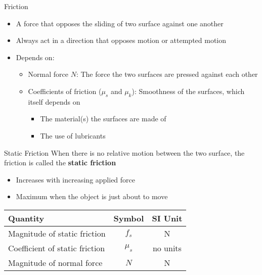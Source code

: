 \documentclass[12pt,compress,aspectratio=169]{beamer}
\begin{document}
\begin{frame}{Friction}
  \begin{itemize}
  \item A force that opposes the sliding of two surface against one another
  \item Always act in a direction that opposes motion or attempted motion
  \item Depends on:
    \begin{itemize}
    \item Normal force $N$: The force the two surfaces are pressed against
      each other
    \item Coefficients of friction ($\mu_s$ and $\mu_k$): Smoothness of the
      surfaces, which itself depends on
      \begin{itemize}
      \item The material(s) the surfaces are made of
      \item The use of lubricants
      \end{itemize}
    \end{itemize}
  \end{itemize}
  \begin{center}
    \vspace{-.1in}
  \end{center}
\end{frame}



\begin{frame}{Static Friction}
  When there is no relative motion between the two surface, the friction is
  called the \textbf{static friction}
  \begin{itemize}
  \item Increases with increasing applied force
  \item Maximum when the object is just about to move
  \end{itemize}

  \begin{center}
    \begin{tabular}{l|c|c}
      \rowcolor{pink}
      \textbf{Quantity} & \textbf{Symbol} & \textbf{SI Unit} \\ \hline
      Magnitude of static friction & $f_s$ & \si\newton \\
      Coefficient of static friction & $\mu_s$ & no units \\
      Magnitude of normal force    & $N$ & \si\newton
    \end{tabular}
  \end{center}
\end{frame}
\end{document}
